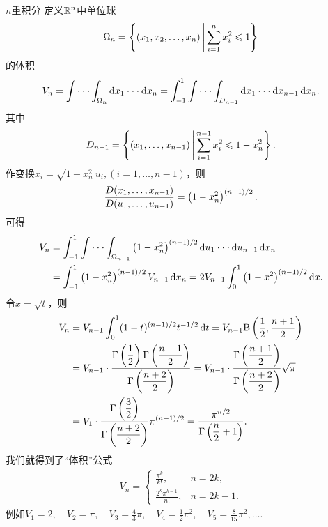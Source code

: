 \begin{example}{$n$重积分}{}
	定义$\mathbb R^n$中单位球
	\[
		\Omega_n=\left\{(x_1,x_2,\ldots,x_n)\,\middle\vert\,\sum_{i=1}^nx_i^2\leqslant 1\right\}
	\]
	的体积
	\[
		V_n=\int\cdot\cdot\cdot\int_{\Omega_n}\mathop{}\!\mathrm{d} x_1\cdot\cdot\cdot\mathop{}\!\mathrm{d} x_n=\int_{-1}^1\int\cdot\cdot\cdot\int_{D_{n-1}}\mathop{}\!\mathrm{d} x_1\cdot\cdot\cdot\mathop{}\!\mathrm{d} x_{n-1}\mathop{}\!\mathrm{d} x_n.
	\]
	其中
	\[
		D_{n-1}=\left\{(x_1,\ldots,x_{n-1})\,\middle\vert\,\sum_{i=1}^{n-1}x_i^2\leqslant 1-x_n^2\right\}.
	\]
	作变换$x_i=\sqrt{1-x_n^2}\,u_i,(i=1,\ldots,n-1)$，则
	\[
		\frac{D(x_1,\ldots,x_{n-1})}{D(u_1,\ldots,u_{n-1})}=\left(1-x_n^2\right)^{\left(n-1\right)/2}.
	\]
	可得
	\begin{align*}
		V_n & =\int_{-1}^1\int\cdot\cdot\cdot\int_{\Omega_{n-1}}\left(1-x_n^2\right)^{\left(n-1\right)/2}\mathop{}\!\mathrm{d} u_1\cdot\cdot\cdot\mathop{}\!\mathrm{d} u_{n-1}\mathop{}\!\mathrm{d} x_n \\
			& =\int_{-1}^1\left(1-x_n^2\right)^{\left(n-1\right)/2}V_{n-1}\mathop{}\!\mathrm{d} x_n=2V_{n-1}\int_0^1\left(1-x^2\right)^{\left(n-1\right)/2}\mathop{}\!\mathrm{d} x.
	\end{align*}
	令$x=\sqrt t$，则
	\begin{align*}
		V_n & =V_{n-1}\int_0^1(1-t)^{\left(n-1\right)/2}t^{-1/2}\mathop{}\!\mathrm{d} t=V_{n-1}\text B\left(\frac12,\frac{n+1}2\right)                                                                  \\
			& =V_{n-1}\cdot\frac{\displaystyle \Gamma\left(\frac12\right)\Gamma\left(\frac{n+1}2\right)}{\displaystyle \Gamma\left(\frac{n+2}2\right)}=V_{n-1}\cdot\frac{\displaystyle \Gamma\left(\frac{n+1}2\right)}{\displaystyle \Gamma\left(\frac{n+2}2\right)}\sqrt\pi \\
			& =V_1\cdot\frac{\displaystyle \Gamma\left(\frac32\right)}{\displaystyle \Gamma\left(\frac{n+2}2\right)}\pi^{\left(n-1\right)/2}=\frac{\displaystyle \pi^{n/2}}{\displaystyle \Gamma\left(\frac n2+1\right)}.
	\end{align*}
	我们就得到了“体积”公式
	\begin{align}
		V_n=
		\begin{cases}
			\frac{\pi^k}{k!},        & n=2k,   \\[
		2ex]
			\frac{2^k\pi^{k-1}}{n!}, & n=2k-1.
		\end{cases}
	\end{align}
	例如$V_1=2,\quad V_2=\pi,\quad V_3=\frac 43\pi,\quad V_4=\frac 12\pi^2,\quad V_5=\frac 8{15}\pi^2,\ldots.$
\end{example}
